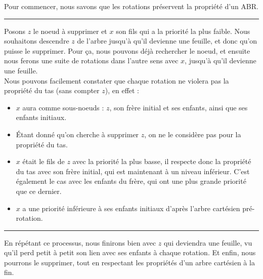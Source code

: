 \documentclass[a4paper,12pt]{report}
\begin{document}
\begin{tcolorbox}[colback=gray!10, colframe=blue!30, coltitle=black, title=Réponse à la 4.a - 1/1]

    Pour commencer, nous savons que les rotations préservent la propriété d'un ABR.

    \vspace{0.5cm}
    \hrule
    \vspace{0.5cm}

    Posons \( z \) le noeud à supprimer et \( x \) son fils qui a la priorité la plus faible. Nous souhaitons descendre \( z \) de l'arbre 
        jusqu'à qu'il devienne une feuille, et donc qu'on puisse le supprimer. Pour ça, nous pouvons déjà rechercher le noeud, et ensuite nous ferons une 
        suite de rotations dans l'autre sens avec \( x \), jusqu'à qu'il devienne une feuille.\\

    Nous pouvons facilement constater que chaque rotation ne violera pas la propriété du tas (sans compter \( z \)), en effet :\\[-0.4cm]
    \begin{itemize}

        \item \( x \) aura comme sous-noeuds : \( z \), son frère initial et ses enfants, ainsi que ses enfants initiaux.
        \item Étant donné qu'on cherche à supprimer \( z \), on ne le considère pas pour la propriété du tas.
        \item \( x \) était le fils de \( z \) avec la priorité la plus basse, il respecte donc la propriété du tas avec son frère initial, qui est maintenant à 
            un niveau inférieur. C'est également le cas avec les enfants du frère, qui ont une plus grande priorité que ce dernier.
        \item \( x \) a une priorité inférieure à ses enfants initiaux d'après l'arbre cartésien pré-rotation.

    \end{itemize}

    \vspace{0.5cm}
    \hrule
    \vspace{0.5cm}

    En répétant ce processus, nous finirons bien avec \( z \) qui deviendra une feuille, vu qu'il perd petit à petit son lien avec ses enfants à chaque rotation.
        Et enfin, nous pourrons le supprimer, tout en respectant les propriétés d'un arbre cartésien à la fin.


\end{tcolorbox}
\end{document}
